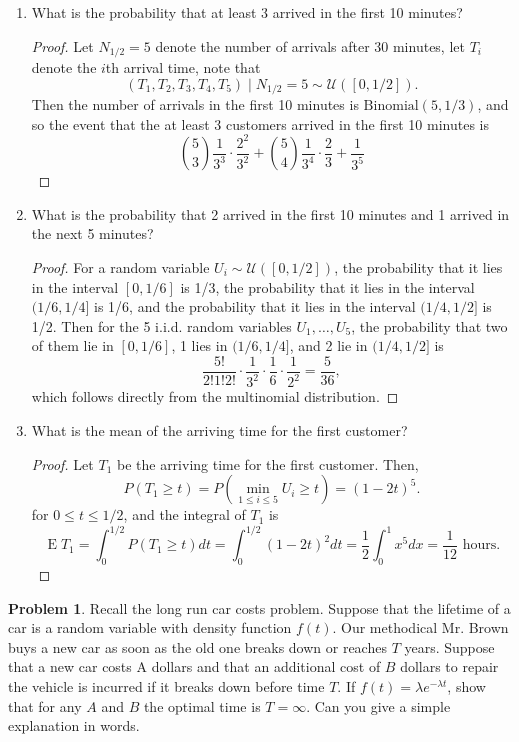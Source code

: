 \documentclass[oneside]{amsart}
\DeclareMathOperator{\E}{\mathrm{E}}
\newcommand{\U}{\mathcal{U}}
\newcommand{\Bin}{\mathrm{Binomial}}
\theoremstyle{definition}
\newtheorem{prob}{Problem}
\begin{document}
\begin{enumerate}[label=(\roman*)]
\item
What is the probability that at least 3 arrived in the first 10 minutes?
\begin{proof}
Let $N_{1/2} = 5$ denote the number of arrivals after 30 minutes, let $T_i$ denote the $i$th arrival time, note that 
\[
	(T_1, T_2, T_3, T_4, T_5) \mid N_{1/2} = 5 \sim \U([0, 1/2]).
\]
Then the number of arrivals in the first 10 minutes is $\Bin(5, 1/3)$, and so the event that the at least 3 customers arrived in the first 10 minutes is 
\[
	\binom{5}{3} \frac{1}{3^3} \cdot \frac{2^2}{3^2}
	+ \binom{5}{4} \frac{1}{3^4}  \cdot  \frac{2}{3}
	+  \frac{1}{3^5} 
\]
\end{proof}
\item
What is the probability that 2 arrived in the first 10 minutes and 1 arrived in the next 5 minutes?
\begin{proof}
For a random variable $U_i \sim \U([0,1/2])$, the probability that it lies in the interval $[0,1/6]$ is 1/3, the probability that it lies in the interval $(1/6, 1/4]$ is 1/6, and the probability that it lies in the interval $(1/4, 1/2]$ is 1/2. Then for the 5 i.i.d. random variables $U_1,\dotsc, U_5$, the probability that two of them lie in $[0,1/6]$, 1 lies in $(1/6, 1/4]$, and 2 lie in $(1/4, 1/2]$ is 
\[
	\frac{5!}{2!1!2!} \cdot \frac{1}{3^2}\cdot \frac{1}{6}\cdot\frac{1}{2^2} = \frac{5}{36},
\]
which follows directly from the multinomial distribution. 
\end{proof}
\item
What is the mean of the arriving time for the first customer?
\begin{proof}
Let $T_1$ be the arriving time for the first customer. Then,
\[
	P(T_1 \geq t) = P\left(\min_{1 \leq i \leq 5} U_i\geq t \right) = (1-2t)^5.
\]
for $0 \leq t \leq 1/2$, and the integral of $T_1$ is 
\[
	\E T_1 = \int_0^{1/2} P(T_1 \geq t) dt 
		= \int_0^{1/2} (1-2t)^2 dt
		= \frac{1}{2} \int_0^1 x^5 dx = \frac{1}{12} \text{ hours}.
\]
\end{proof}

\end{enumerate}

\begin{prob}
Recall the long run car costs problem. Suppose that the lifetime of a car is a random variable with density function $f(t)$. Our methodical Mr. Brown buys a new car as soon as the old one breaks down or reaches $T$ years. Suppose that a new car costs A dollars and that an additional cost of $B$ dollars to repair the vehicle is incurred if it breaks down before time $T$. If $f(t) = \lambda e^{-\lambda t}$, show that for any $A$ and $B$ the optimal time is $T=\infty$. Can you give a simple explanation in words.
\end{prob}
\end{document}
